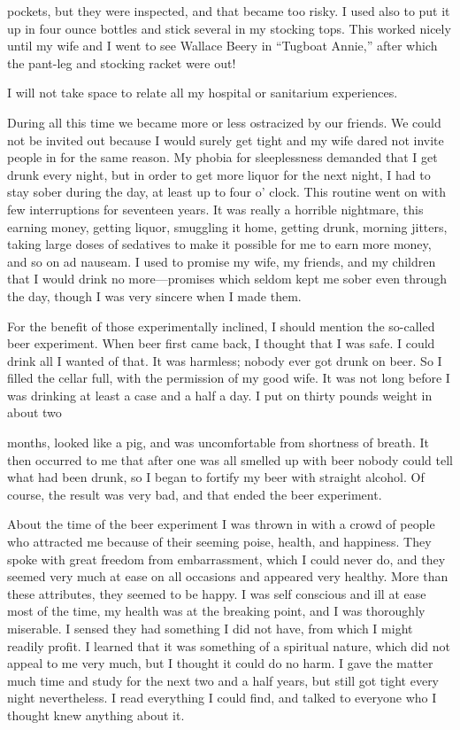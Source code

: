 \begin{biblechapter}
pockets, but they were inspected, and that became too risky. I used also to put it up in four ounce bottles and stick several in my stocking tops. This worked nicely until my wife and I went to see Wallace Beery in “Tugboat Annie,” after which the pant-leg and stocking racket were out!

I will not take space to relate all my hospital or sanitarium experiences.

During all this time we became more or less ostracized by our friends. We could not be invited out because I would surely get tight and my wife dared not invite people in for the same reason. My phobia for sleeplessness demanded that I get drunk every night, but in order to get more liquor for the next night, I had to stay sober during the day, at least up to four o’ clock. This routine went on with few interruptions for seventeen years. It was really a horrible nightmare, this earning money, getting liquor, smuggling it home, getting drunk, morning jitters, taking large doses of sedatives to make it possible for me to earn more money, and so on ad nauseam. I used to promise my wife, my friends, and my children that I would drink no more—promises which seldom kept me sober even through the day, though I was very sincere when I made them.

For the benefit of those experimentally inclined, I should mention the so-called beer experiment. When beer first came back, I thought that I was safe. I could drink all I wanted of that. It was harmless; nobody ever got drunk on beer. So I filled the cellar full, with the permission of my good wife. It was not long before I was drinking at least a case and a half a day. I put on thirty pounds weight in about two

months, looked like a pig, and was uncomfortable from shortness of breath. It then occurred to me that after one was all smelled up with beer nobody could tell what had been drunk, so I began to fortify my beer with straight alcohol. Of course, the result was very bad, and that ended the beer experiment.

About the time of the beer experiment I was thrown in with a crowd of people who attracted me because of their seeming poise, health, and happiness. They spoke with great freedom from embarrassment, which I could never do, and they seemed very much at ease on all occasions and appeared very healthy. More than these attributes, they seemed to be happy. I was self conscious and ill at ease most of the time, my health was at the breaking point, and I was thoroughly miserable. I sensed they had something I did not have, from which I might readily profit. I learned that it was something of a spiritual nature, which did not appeal to me very much, but I thought it could do no harm. I gave the matter much time and study for the next two and a half years, but still got tight every night nevertheless. I read everything I could find, and talked to everyone who I thought knew anything about it.


\end{biblechapter}
